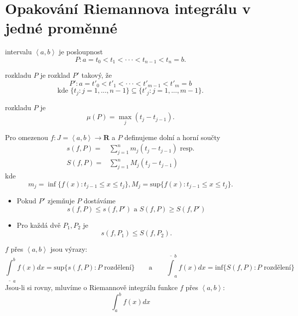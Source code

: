 \documentclass[../main.tex]{subfiles}
\begin{document}
\section{Opakování Riemannova integrálu v jedné proměnné}

\begin{definitionnodot}[Rozdělení]
	intervalu $\left<a,b\right>$ je posloupnost 
	\[P : a = t_0 < t_1 < \cdot \cdot \cdot < t_{n-1} < t_n = b.\]
\end{definitionnodot}

\begin{definitionnodot}[Zjemnění]
	rozkladu $P$ je rozklad $P'$ takový, že
		\[P' : a = t'_0 < t'_1 < \cdot \cdot \cdot < t'_{m-1} < t'_m = b\]
		\[\text{kde }\{t_j: j = 1,...,n-1\}\subseteq \{t'_j : j = 1,...,m-1\}.\]
\end{definitionnodot}

\begin{definitionnodot}[Jemnost]
	rozkladu $P$ je $$\mu(P) = \max_j(t_j-t_{j-1}).$$
\end{definitionnodot}

\begin{definition}
	Pro omezenou $f:J=\left<a,b\right> \rightarrow \mathbf{R} $ a $P$ definujeme dolní a horní součty
	\begin{align*}
	    s(f,P) = & \sum^n_{j=1} m_j(t_j-t_{j-1}) \text{ resp.}\\
	    S(f,P) = & \sum^n_{j=1} M_j(t_j-t_{j-1})
	\end{align*}
	kde
	\[m_j = \inf\{f(x) : t_{j-1} \leq x \leq t_j\}, M_j = \text{sup}\{f(x) : t_{j-1} \leq x \leq t_j\}.\]
\end{definition}

\begin{lemma}
	\hfill
	\begin{itemize}
			\item Pokud $P'$ zjemňuje $P$ dostáváme
			\[s(f,P) \leq s(f,P') \text{ a } S(f,P) \geq S(f,P')\]
			\item Pro každá dvě $P_1, P_2$ je 
			\[s(f,P_1) \leq S(f, P_2).\]
	\end{itemize}
\end{lemma}

\begin{definitionnodot}
	$f$ přes $\left<a,b\right>$ jsou výrazy:
	$$\underline{\int}^b_{ a} f(x)dx = \text{sup}\{s(f,P) : P \text{ rozdělení}\} \qquad \text{a}\qquad
	\overline{\int}^b_{ a} f(x)dx = \text{inf}\{S(f,P) : P \text{ rozdělení}\}$$ 
	Jsou-li si rovny, mluvíme o Riemannově integrálu funkce $f$ přes $\left<a,b\right>$:
	\[\int^b_a f(x) dx\]
\end{definitionnodot}
\end{document}
